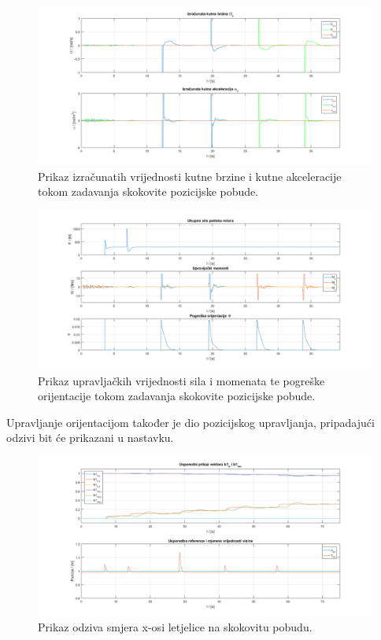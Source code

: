 \documentclass[times, utf8, diplomski, numeric]{fer}
\begin{document}
	\newpage
	\clearpage
	
	\begin{figure}[!h]
		\includegraphics[width=\textwidth]{plots/pos_alpha_omega2.png}
		\caption{Prikaz izračunatih vrijednosti kutne brzine i kutne  akceleracije  tokom zadavanja skokovite pozicijske pobude.}
	\end{figure}
	
	\begin{figure}[h!]
		\includegraphics[width=\textwidth]{plots/pos_force_moments2.png}
		\caption{Prikaz upravljačkih vrijednosti sila i momenata te pogreške orijentacije tokom zadavanja skokovite pozicijske pobude.}
	\end{figure}
	
	Upravljanje orijentacijom također je dio pozicijskog upravljanja, pripadajući odzivi bit će prikazani u nastavku.
	
	\newpage
	\clearpage
	
	\begin{figure}[h!]
		\includegraphics[width=\textwidth]{plots/b1d_b1d2.png}
		\caption{Prikaz odziva smjera x-osi letjelice na skokovitu pobudu.}
	\end{figure}
\end{document}
